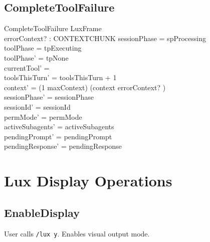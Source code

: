 \documentclass[a4paper,10pt,fleqn]{article}
\begin{document}
\subsection{CompleteToolFailure}

\begin{schema}{CompleteToolFailure}
  LuxFrame \\
  errorContext? : CONTEXTCHUNK
  \where
  sessionPhase = spProcessing \\
  toolPhase = tpExecuting \\
  toolPhase' = tpNone \\
  currentTool' = \emptyset \\
  toolsThisTurn' = toolsThisTurn + 1 \\
  context' = (1 \upto maxContext) \dres (context \cat \langle errorContext? \rangle) \\
  sessionPhase' = sessionPhase \\
  sessionId' = sessionId \\
  permMode' = permMode \\
  activeSubagents' = activeSubagents \\
  pendingPrompt' = pendingPrompt \\
  pendingResponse' = pendingResponse
\end{schema}

\section{Lux Display Operations}

\subsection{EnableDisplay}

User calls \texttt{/lux y}. Enables visual output mode.
\end{document}
